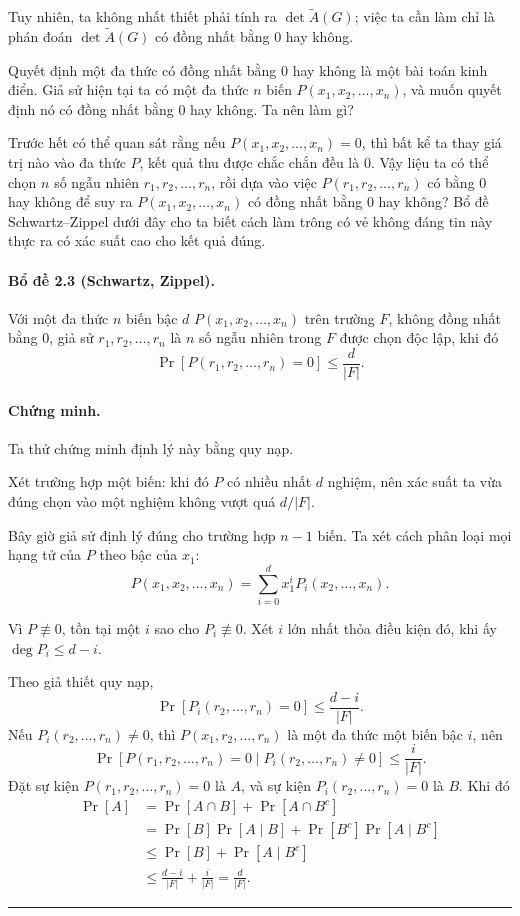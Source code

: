 \documentclass[11pt]{article}
\newcommand{\qedmark}{\hfill\rule{0.7ex}{0.7ex}}
\begin{document}
Tuy nhiên, ta không nhất thiết phải tính ra \(\det\tilde A(G)\); việc ta cần
làm chỉ là phán đoán \(\det\tilde A(G)\) có đồng nhất bằng \(0\) hay không.

Quyết định một đa thức có đồng nhất bằng \(0\) hay không là một bài toán kinh
điển. Giả sử hiện tại ta có một đa thức \(n\) biến
\(P(x_1,x_2,\ldots,x_n)\), và muốn quyết định nó có đồng nhất bằng \(0\) hay
không. Ta nên làm gì?

Trước hết có thể quan sát rằng nếu \(P(x_1,x_2,\ldots,x_n)=0\), thì bất kể ta
thay giá trị nào vào đa thức \(P\), kết quả thu được chắc chắn đều là \(0\).
Vậy liệu ta có thể chọn \(n\) số ngẫu nhiên \(r_1,r_2,\ldots,r_n\), rồi dựa
vào việc \(P(r_1,r_2,\ldots,r_n)\) có bằng \(0\) hay không để suy ra
\(P(x_1,x_2,\ldots,x_n)\) có đồng nhất bằng \(0\) hay không? Bổ đề
Schwartz--Zippel dưới đây cho ta biết cách làm trông có vẻ không đáng tin này
thực ra có xác suất cao cho kết quả đúng.

\paragraph{Bổ đề 2.3 (Schwartz, Zippel).}
Với một đa thức \(n\) biến bậc \(d\) \(P(x_1,x_2,\ldots,x_n)\) trên trường
\(F\), không đồng nhất bằng \(0\), giả sử \(r_1,r_2,\ldots,r_n\) là \(n\) số
ngẫu nhiên trong \(F\) được chọn độc lập, khi đó
\[
  \Pr[P(r_1,r_2,\ldots,r_n)=0]\le \frac{d}{|F|}.
\]

\paragraph{Chứng minh.}
Ta thử chứng minh định lý này bằng quy nạp.

Xét trường hợp một biến: khi đó \(P\) có nhiều nhất \(d\) nghiệm, nên xác suất
ta vừa đúng chọn vào một nghiệm không vượt quá \(d/|F|\).

Bây giờ giả sử định lý đúng cho trường hợp \(n-1\) biến. Ta xét cách phân loại
mọi hạng tử của \(P\) theo bậc của \(x_1\):
\[
  P(x_1,x_2,\ldots,x_n)
  =\sum_{i=0}^{d}x_1^iP_i(x_2,\ldots,x_n).
\]

Vì \(P\not\equiv 0\), tồn tại một \(i\) sao cho \(P_i\not\equiv 0\). Xét \(i\)
lớn nhất thỏa điều kiện đó, khi ấy \(\deg P_i\le d-i\).

Theo giả thiết quy nạp,
\[
  \Pr[P_i(r_2,\ldots,r_n)=0]\le \frac{d-i}{|F|}.
\]
Nếu \(P_i(r_2,\ldots,r_n)\ne 0\), thì \(P(x_1,r_2,\ldots,r_n)\) là một đa thức
một biến bậc \(i\), nên
\[
  \Pr[P(r_1,r_2,\ldots,r_n)=0
  \mid P_i(r_2,\ldots,r_n)\ne 0]\le \frac{i}{|F|}.
\]
Đặt sự kiện \(P(r_1,r_2,\ldots,r_n)=0\) là \(A\), và sự kiện
\(P_i(r_2,\ldots,r_n)=0\) là \(B\). Khi đó
\[
\begin{aligned}
  \Pr[A]
  &=\Pr[A\cap B]+\Pr[A\cap B^c]\\
  &=\Pr[B]\Pr[A\mid B]+\Pr[B^c]\Pr[A\mid B^c]\\
  &\le \Pr[B]+\Pr[A\mid B^c]\\
  &\le \frac{d-i}{|F|}+\frac{i}{|F|}
   = \frac{d}{|F|}.
\end{aligned}
\]
\qedmark
\end{document}
